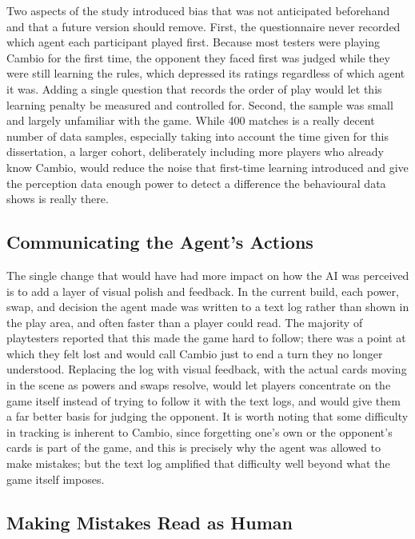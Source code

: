 \documentclass[12pt,a4paper,oneside]{report}
\begin{document}
Two aspects of the study introduced bias that was not anticipated beforehand and that a future version should remove. First, the  questionnaire never recorded which agent each participant played first. Because
most testers were playing Cambio for the first time, the opponent they faced
first was judged while they were still learning the rules, which depressed its ratings
regardless of which agent it was. Adding a single question that records the order of play
would let this learning penalty be measured and controlled for. Second, the sample was small and largely unfamiliar with the game. While 400 matches is a really decent number of data samples, especially taking into account the time given for this dissertation, a larger cohort, deliberately including more players who already know Cambio, would reduce the
noise that first-time learning introduced and give the perception data enough power to
detect a difference the behavioural data shows is really there.


\subsection{Communicating the Agent's Actions}

The single change that would have had more impact on how the AI was perceived is to add a layer of visual polish and feedback. In the current build, each power, swap, and decision the agent made was written to a text log rather
than shown in the play area, and often faster than a player could read. The majority of
playtesters reported that this made the game hard to follow; there was a point at which
they felt lost and would call Cambio just to end a turn they no longer understood.
Replacing the log with visual feedback, with the actual cards moving in the scene as
powers and swaps resolve, would let players concentrate on the game itself instead of
trying to follow it with the text logs, and would give them a far better basis for judging the
opponent. It is worth noting that some difficulty in tracking is inherent to Cambio, since forgetting one's own or the opponent's cards is part of the game, and this is precisely why the agent was allowed to make mistakes; but the text log amplified that difficulty well beyond what the game itself imposes.

\subsection{Making Mistakes Read as Human}
\end{document}
